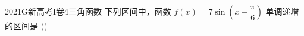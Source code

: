 
\begin{problem}{2021}{G}{新高考I卷}{4}{三角函数}
下列区间中，函数 $ f(x)=7\sin\left(x-\dfrac{\pi}{6}\right) $ 单调递增的区间是 (\hspace{1cm})
\end{problem}

\begin{choices}
\end{choices}